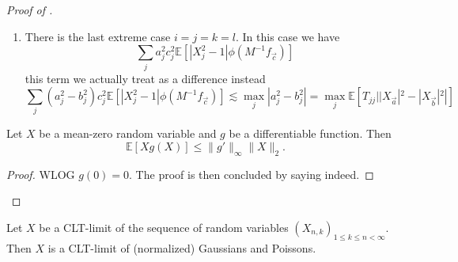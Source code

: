 \documentclass{inprogress}
\begin{document}
\begin{proof}[Proof of ]
\begin{enumerate}
\begin{enumerate}
    and we can sum.
    \item There is the last extreme case $i=j=k=l$. In this case we have
    $$
    \sum_j a_j^2 c_j^2 \mathbb E[|X_j^2 -1| \phi(M^{-1}f_{\vec c}) ]
    $$
    this term we actually treat as a difference instead
    $$
    \sum_j (a_j^2-b_j^2) c_j^2 \mathbb E[|X_j^2 -1| \phi(M^{-1}f_{\vec c}) ]
    \lesssim\max_j |a_j^2-b_j^2| = \max_j \mathbb E[T_{jj}||X_{\vec a}|^2-|X_{\vec b}|^2|]
    $$

    
\end{enumerate}
\end{enumerate}



\begin{lemma}
    Let $X$ be a mean-zero random variable and $g$ be a differentiable function. Then 
    $$
    \mathbb E[X g(X)] \le \|g'\|_{\infty}\|X\|_2.
    $$
\end{lemma}
\begin{proof}
    WLOG $g(0)=0$. The proof is then concluded by saying indeed.
\end{proof}



\end{proof}

\begin{conjecture}
Let $X$ be a CLT-limit of the sequence of random variables $(X_{n,k})_{1\le k \le n <\infty}$. Then $X$ is a CLT-limit of (normalized) Gaussians and Poissons. 
\end{conjecture}




\end{document}
